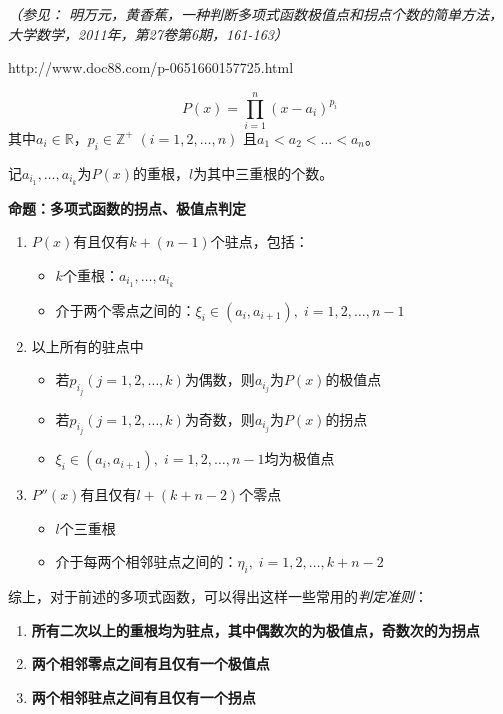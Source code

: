 \begin{shaded}
	{\it（参见： 明万元，黄香蕉，一种判断多项式函数极值点和拐点个数的简单方法，
	大学数学，2011年，第27卷第6期，161-163）
	
	http://www.doc88.com/p-0651660157725.html}
	$$P(x)=\prod_{i=1}^n(x-a_i)^{p_i}$$
	其中$a_i\in\mathbb{R}$，$p_i\in\mathbb{Z}^+\;(i=1,2,\ldots,n)$
	且$a_1<a_2<\ldots<a_n$。
	
	记$a_{i_1},\ldots,a_{i_k}$为$P(x)$的重根，$l$为其中三重根的个数。
	
	{\bf 命题：}{\bf 多项式函数的拐点、极值点判定}
	\begin{enumerate}
  	  \setlength{\itemindent}{1cm}
	  \item $P(x)$有且仅有$k+(n-1)$个驻点，包括：
	  \begin{itemize}
	    \setlength{\itemindent}{0.5cm}
	    \item $k$个重根：$a_{i_1},\ldots,a_{i_k}$
	    \item 介于两个零点之间的：$\xi_i\in(a_i,a_{i+1}),\;i=1,2,\ldots,n-1$
	  \end{itemize}
	  \item 以上所有的驻点中
	  \begin{itemize}
	    \setlength{\itemindent}{0.5cm}
	    \item 若$p_{i_j}(j=1,2,\ldots,k)$为偶数，则$a_{i_j}$为$P(x)$的极值点
	    \item 若$p_{i_j}(j=1,2,\ldots,k)$为奇数，则$a_{i_j}$为$P(x)$的拐点
	    \item $\xi_i\in(a_i,a_{i+1}),\;i=1,2,\ldots,n-1$均为极值点
	  \end{itemize}
	  \item $P''(x)$有且仅有$l+(k+n-2)$个零点
	  \begin{itemize}
	    \setlength{\itemindent}{0.5cm}
	    \item $l$个三重根
	    \item 介于每两个相邻驻点之间的：$\eta_i,\;i=1,2,\ldots,k+n-2$
	  \end{itemize}
	\end{enumerate}
	
	综上，对于前述的多项式函数，可以得出这样一些常用的{\it 判定准则}：
	\begin{enumerate}[(1)]
  	  \setlength{\itemindent}{1cm}
	  \item {\b\bf 所有二次以上的重根均为驻点，其中偶数次的为极值点，奇数次的为拐点}
	  \item {\b\bf 两个相邻零点之间有且仅有一个极值点}
	  \item {\b\bf 两个相邻驻点之间有且仅有一个拐点}
	\end{enumerate}
	

\end{shaded}
